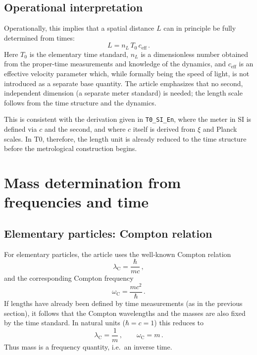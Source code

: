 \subsection{Operational interpretation}

Operationally, this implies that a spatial distance $L$ can in principle be
fully determined from times:
\begin{equation}
  L = n_L \, T_0 \, c_{\text{eff}} \, .
\end{equation}
Here $T_0$ is the elementary time standard, $n_L$ is a dimensionless number
obtained from the proper-time measurements and knowledge of the dynamics, and
$c_{\text{eff}}$ is an effective velocity parameter which, while formally being
the speed of light, is not introduced as a separate base quantity. The article
emphasizes that no second, independent dimension (a separate meter standard) is
needed; the length scale follows from the time structure and the dynamics.

This is consistent with the derivation given in \texttt{T0\_SI\_En}, where the
meter in SI is defined via $c$ and the second, and where $c$ itself is derived
from $\xi$ and Planck scales. In T0, therefore, the length unit is already
reduced to the time structure before the metrological construction begins.

\section{Mass determination from frequencies and time}
\label{sec:mass_Entermination}

\subsection{Elementary particles: Compton relation}

For elementary particles, the article uses the well-known Compton relation
\begin{equation}
  \lambda_{\mathrm{C}} = \frac{\hbar}{m c} \, ,
\end{equation}
and the corresponding Compton frequency
\begin{equation}
  \omega_{\mathrm{C}} = \frac{m c^2}{\hbar} \, .
\end{equation}
If lengths have already been defined by time measurements (as in the previous
section), it follows that the Compton wavelengths and the masses are also
fixed by the time standard. In natural units ($\hbar = c = 1$) this reduces to
\begin{equation}
  \lambda_{\mathrm{C}} = \frac{1}{m} \, , \qquad \omega_{\mathrm{C}} = m \, .
\end{equation}
Thus mass is a frequency quantity, i.e.\ an inverse time.

